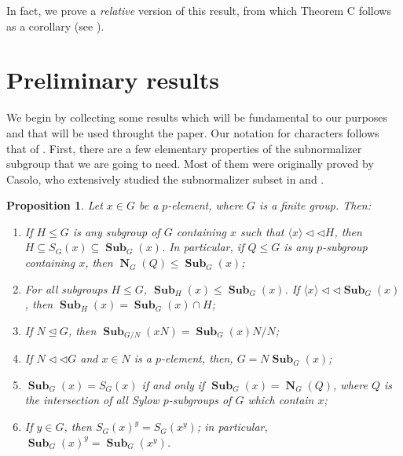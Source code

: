 \documentclass[12pt]{amsart}
\DeclareMathOperator{\NB}{\mathbf{N}}
\DeclareMathOperator{\Sub}{\mathbf{Sub}}
\theoremstyle{remark}
\theoremstyle{definition}
\theoremstyle{plain}
\newtheorem{pro}[thm]{Proposition}
\theoremstyle{definition}
\numberwithin{equation}{section}
\begin{document}
In fact, we prove a \emph{relative} version of this result, from which Theorem C follows as a corollary (see ).

\section{Preliminary results}

We begin by collecting some results which will be fundamental to our purposes and that will be used throught the paper. Our notation for characters follows that of \cite{CTFG}. First, there are a few elementary properties of the subnormalizer subgroup that we are going to need. Most of them were originally proved by Casolo, who extensively studied the subnormalizer subset in \cite{CasoloSubnormalizers} and \cite{CasoloSubnormalizersSubgroups}.

\begin{pro}
	\label{SubnormalizerProperties}
	Let $x \in G$ be a $p$-element, where $G$ is a finite group. Then:
	\begin{enumerate}
		\item If $H \leq G$ is any subgroup of $G$ containing $x$ such that $\langle x \rangle {\triangleleft}{\triangleleft} H$, then $H \subseteq S_G(x) \subseteq \Sub_G(x)$. In particular, if $Q \leq G$ is any $p$-subgroup containing $x$, then $\NB_G(Q) \leq \Sub_G(x)$;
		\item For all subgroups $H \leq G$, $\Sub_H(x) \leq \Sub_G(x)$. If $\langle x \rangle {\triangleleft}{\triangleleft} \Sub_G(x)$, then $\Sub_H(x) = \Sub_G(x) \cap H$;
		\item If $N \unlhd G$, then $\Sub_{G/N}(xN) = \Sub_G(x)N/N$;
		\item If $N {\triangleleft}{\triangleleft} G$ and $x \in N$ is a $p$-element, then, $G = N\Sub_G(x)$;
		\item $\Sub_G(x) = S_G(x)$ if and only if $\Sub_G(x) = \NB_G(Q)$, where $Q$ is the intersection of all Sylow $p$-subgroups of $G$ which contain $x$;
		\item If $y \in G$, then $S_G(x)^y = S_G(x^y)$; in particular, $\Sub_G(x)^y = \Sub_G(x^y)$.
	\end{enumerate}
\end{pro}
\end{document}
